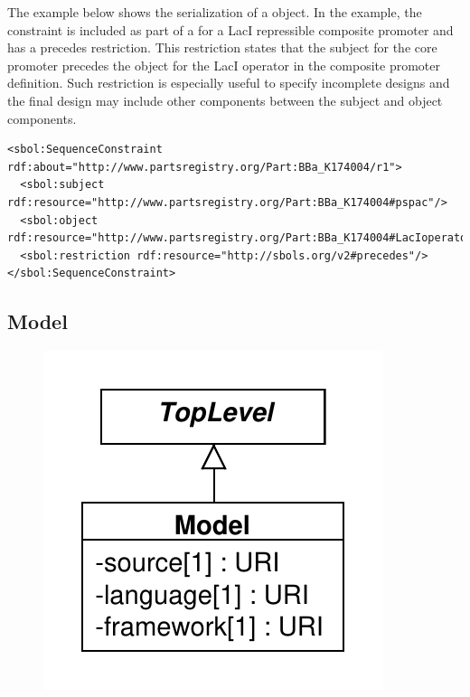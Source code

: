 The example below shows the serialization of a  object. In the example, the constraint is included as part of a  for a LacI repressible composite promoter and has a precedes restriction. This restriction states that the subject  for the core promoter precedes the object  for the LacI operator in the composite promoter definition. Such restriction is especially useful to specify incomplete designs and the final design may include other components between the subject and object components. 
\begin{lstlisting}
<sbol:SequenceConstraint rdf:about="http://www.partsregistry.org/Part:BBa_K174004/r1">
  <sbol:subject rdf:resource="http://www.partsregistry.org/Part:BBa_K174004#pspac"/>
  <sbol:object rdf:resource="http://www.partsregistry.org/Part:BBa_K174004#LacIoperator"/>
  <sbol:restriction rdf:resource="http://sbols.org/v2#precedes"/>
</sbol:SequenceConstraint>
\end{lstlisting}


\subsection{Model}
\label{sec:Model}

\begin{figure}[ht]
\begin{center}
\includegraphics[scale=0.6]{uml/model}
\caption[]{}
\label{uml:model}
\end{center}
\end{figure}

